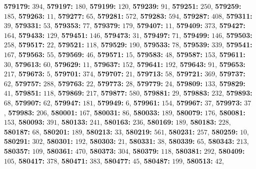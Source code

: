 \textsf{\bfseries 579179:} $394$, \textsf{\bfseries 579197:} $180$, \textsf{\bfseries 579199:} $120$, \textsf{\bfseries 579239:} $91$, \textsf{\bfseries 579251:} $250$, \textsf{\bfseries 579259:} $185$, \textsf{\bfseries 579263:} $11$, \textsf{\bfseries 579277:} $65$, \textsf{\bfseries 579281:} $572$, \textsf{\bfseries 579283:} $594$, \textsf{\bfseries 579287:} $408$, \textsf{\bfseries 579311:} $39$, \textsf{\bfseries 579331:} $53$, \textsf{\bfseries 579353:} $77$, \textsf{\bfseries 579379:} $179$, \textsf{\bfseries 579407:} $11$, \textsf{\bfseries 579409:} $373$, \textsf{\bfseries 579427:} $164$, \textsf{\bfseries 579433:} $129$, \textsf{\bfseries 579451:} $146$, \textsf{\bfseries 579473:} $31$, \textsf{\bfseries 579497:} $71$, \textsf{\bfseries 579499:} $146$, \textsf{\bfseries 579503:} $258$, \textsf{\bfseries 579517:} $22$, \textsf{\bfseries 579521:} $118$, \textsf{\bfseries 579529:} $190$, \textsf{\bfseries 579533:} $78$, \textsf{\bfseries 579539:} $339$, \textsf{\bfseries 579541:} $167$, \textsf{\bfseries 579563:} $55$, \textsf{\bfseries 579569:} $46$, \textsf{\bfseries 579571:} $15$, \textsf{\bfseries 579583:} $48$, \textsf{\bfseries 579587:} $153$, \textsf{\bfseries 579611:} $30$, \textsf{\bfseries 579613:} $60$, \textsf{\bfseries 579629:} $11$, \textsf{\bfseries 579637:} $152$, \textsf{\bfseries 579641:} $192$, \textsf{\bfseries 579643:} $91$, \textsf{\bfseries 579653:} $217$, \textsf{\bfseries 579673:} $5$, \textsf{\bfseries 579701:} $374$, \textsf{\bfseries 579707:} $21$, \textsf{\bfseries 579713:} $58$, \textsf{\bfseries 579721:} $369$, \textsf{\bfseries 579737:} $62$, \textsf{\bfseries 579757:} $288$, \textsf{\bfseries 579763:} $22$, \textsf{\bfseries 579773:} $28$, \textsf{\bfseries 579779:} $24$, \textsf{\bfseries 579809:} $133$, \textsf{\bfseries 579829:} $41$, \textsf{\bfseries 579851:} $118$, \textsf{\bfseries 579869:} $217$, \textsf{\bfseries 579877:} $580$, \textsf{\bfseries 579881:} $29$, \textsf{\bfseries 579883:} $232$, \textsf{\bfseries 579893:} $68$, \textsf{\bfseries 579907:} $62$, \textsf{\bfseries 579947:} $181$, \textsf{\bfseries 579949:} $6$, \textsf{\bfseries 579961:} $154$, \textsf{\bfseries 579967:} $37$, \textsf{\bfseries 579973:} $37$, \textsf{\bfseries 579983:} $206$, \textsf{\bfseries 580001:} $167$, \textsf{\bfseries 580031:} $86$, \textsf{\bfseries 580033:} $189$, \textsf{\bfseries 580079:} $176$, \textsf{\bfseries 580081:} $153$, \textsf{\bfseries 580093:} $391$, \textsf{\bfseries 580133:} $241$, \textsf{\bfseries 580163:} $236$, \textsf{\bfseries 580169:} $189$, \textsf{\bfseries 580183:} $228$, \textsf{\bfseries 580187:} $68$, \textsf{\bfseries 580201:} $189$, \textsf{\bfseries 580213:} $33$, \textsf{\bfseries 580219:} $561$, \textsf{\bfseries 580231:} $257$, \textsf{\bfseries 580259:} $10$, \textsf{\bfseries 580291:} $302$, \textsf{\bfseries 580301:} $192$, \textsf{\bfseries 580303:} $21$, \textsf{\bfseries 580331:} $38$, \textsf{\bfseries 580339:} $65$, \textsf{\bfseries 580343:} $213$, \textsf{\bfseries 580357:} $109$, \textsf{\bfseries 580361:} $470$, \textsf{\bfseries 580373:} $304$, \textsf{\bfseries 580379:} $118$, \textsf{\bfseries 580381:} $292$, \textsf{\bfseries 580409:} $105$, \textsf{\bfseries 580417:} $378$, \textsf{\bfseries 580471:} $383$, \textsf{\bfseries 580477:} $45$, \textsf{\bfseries 580487:} $199$, \textsf{\bfseries 580513:} $42$, 
